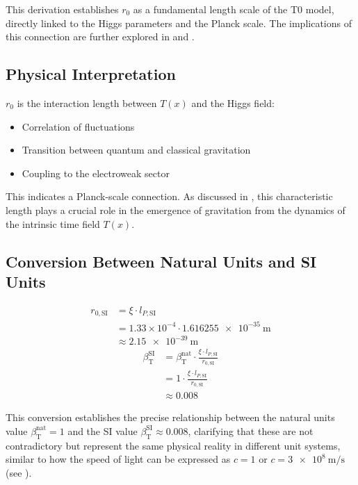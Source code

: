 \documentclass[12pt,a4paper]{article}
\newcommand{\Tfield}{T(x)}
\newcommand{\betaT}{\beta_{\text{T}}}
\begin{document}
	This derivation establishes \(r_0\) as a fundamental length scale of the T0 model, directly linked to the Higgs parameters and the Planck scale. The implications of this connection are further explored in \cite{pascher_planck_2025} and \cite{pascher_higgs_2025}.
	
	\subsection{Physical Interpretation}
	\label{subsec:physical_interpretation}
	
	\(r_0\) is the interaction length between \(\Tfield\) and the Higgs field:
	\begin{itemize}
		\item Correlation of fluctuations
		\item Transition between quantum and classical gravitation
		\item Coupling to the electroweak sector
	\end{itemize}
	This indicates a Planck-scale connection. As discussed in \cite{pascher_emergente_gravitation_2025}, this characteristic length plays a crucial role in the emergence of gravitation from the dynamics of the intrinsic time field \(\Tfield\).
	
	\subsection{Conversion Between Natural Units and SI Units}
	\label{subsec:conversion_units}
	
	\begin{align}
		r_{0,\text{SI}} &= \xi \cdot l_{P,\text{SI}} \\
		&= 1.33 \times 10^{-4} \cdot \SI{1.616255e-35}{\meter} \\
		&\approx \SI{2.15e-39}{\meter}
	\end{align}
	\begin{align}
		\betaT^{\text{SI}} &= \betaT^{\text{nat}} \cdot \frac{\xi \cdot l_{P,\text{SI}}}{r_{0,\text{SI}}} \\
		&= 1 \cdot \frac{\xi \cdot l_{P,\text{SI}}}{r_{0,\text{SI}}} \\
		&\approx 0.008
	\end{align}
	
	This conversion establishes the precise relationship between the natural units value \(\betaT^{\text{nat}} = 1\) and the SI value \(\betaT^{\text{SI}} \approx 0.008\), clarifying that these are not contradictory but represent the same physical reality in different unit systems, similar to how the speed of light can be expressed as \(c = 1\) or \(c = \SI{3e8}{\meter\per\second}\) (see \cite{pascher_alphabeta_2025}).
	
\end{document}
